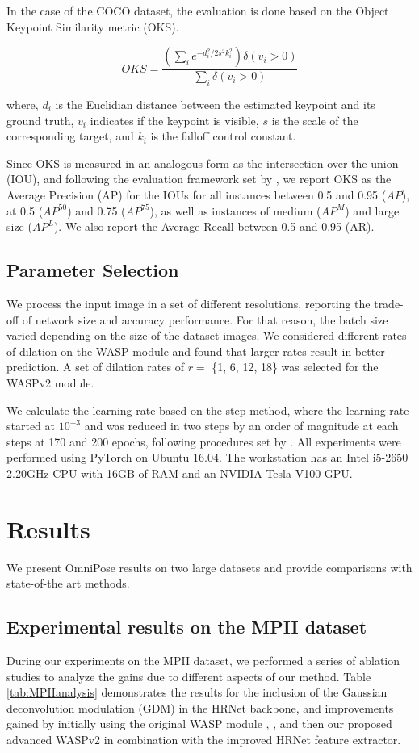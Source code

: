 \documentclass[10pt,twocolumn,letterpaper]{article}
\begin{document}
In the case of the COCO dataset, the evaluation is done based on the Object Keypoint Similarity metric (OKS).

\begin{equation}
    OKS = \frac{(\sum_i{e^{-d_i^2/2s^2k^2_i}})\delta(v_i>0)}{\sum_i\delta(v_i>0)}
\end{equation}

\noindent 
where, $d_i$ is the Euclidian distance between the estimated keypoint and its ground truth, $v_i$ indicates if the keypoint is visible, $s$ is the scale of the corresponding target, and $k_i$ is the falloff control constant.

Since OKS is measured in an analogous form as the intersection over the union (IOU), and following the evaluation framework set by \cite{COCO}, we report OKS as the Average Precision (AP) for the IOUs for all instances between 0.5 and 0.95 ($AP$), at 0.5 ($AP^{50}$) and 0.75 ($AP^{75}$), as well as instances of medium ($AP^M$) and large size ($AP^L$). We also report the Average Recall between 0.5 and 0.95 (AR). 

\subsection{Parameter Selection}
We process the input image in a set of different resolutions, reporting the trade-off of network size and accuracy performance.
For that reason, the batch size varied depending on the size of the dataset images.
We considered different rates of dilation on the WASP module and found that larger rates result in better prediction. A set of dilation rates of $r =$ \{1, 6, 12, 18\} was selected for the WASPv2 module.

We calculate the learning rate based on the step method, where the learning rate started at $10^{-3}$ and was reduced in two steps by an order of magnitude at each steps at 170 and 200 epochs, following procedures set by \cite{DarkPose}. 
All experiments were performed using PyTorch on Ubuntu 16.04. The workstation has an Intel i5-2650 2.20GHz CPU with 16GB of RAM and an NVIDIA Tesla V100 GPU.

\section{Results}
We present OmniPose results on two large datasets and provide comparisons with state-of-the art methods.


\subsection{Experimental results on the MPII dataset}
During our experiments on the MPII dataset, we performed a series of ablation studies to analyze the gains due to different aspects of our method. Table \ref{tab:MPIIanalysis} demonstrates the results for the inclusion of the Gaussian deconvolution modulation (GDM) in the HRNet backbone, and improvements gained by initially using the original WASP module \cite{WASP}, \cite{UniPose}, and then our proposed advanced WASPv2 in combination with the improved HRNet feature extractor.
\end{document}
